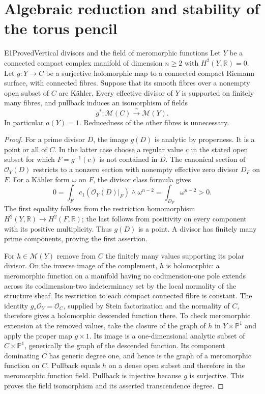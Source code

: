 \section{Algebraic reduction and stability of the torus pencil}
\label{sec:E}

\begin{statement}{E1}{Proved}{Vertical divisors and the field of meromorphic functions}
Let $Y$ be a connected compact complex manifold of dimension $n\geq2$
with $H^2(Y,\mathbb R)=0$. Let $g:Y\to C$ be a surjective holomorphic
map to a connected compact Riemann surface, with connected fibres.
Suppose that its smooth fibres over a nonempty open subset of $C$ are
K\"ahler. Every effective divisor of $Y$ is supported on finitely many
fibres, and pullback induces an isomorphism of fields
\[
 g^*: \mathcal M(C)\xrightarrow{\ \sim\ }\mathcal M(Y).
\]
In particular $a(Y)=1$. Reducedness of the other fibres is unnecessary.
\end{statement}
\begin{proof}
For a prime divisor $D$, the image $g(D)$ is analytic by properness. It
is a point or all of $C$. In the latter case choose a regular value $c$
in the stated open subset for which $F=g^{-1}(c)$ is not contained in
$D$. The canonical section of $\mathcal O_Y(D)$ restricts to a nonzero
section with nonempty effective zero divisor $D_F$ on $F$. For a
K\"ahler form $\omega$ on $F$, the divisor class formula gives
\[
 0=\int_F c_1(\mathcal O_Y(D)|_F)\wedge\omega^{n-2}
   =\int_{D_F}\omega^{n-2}>0.
\]
The first equality follows from the restriction homomorphism
$H^2(Y,\mathbb R)\to H^2(F,\mathbb R)$; the last follows from positivity
on every component with its positive multiplicity. Thus $g(D)$ is a
point. A divisor has finitely many prime components, proving the first
assertion.

For $h\in\mathcal M(Y)$ remove from $C$ the finitely many values
supporting its polar divisor. On the inverse image of the complement,
$h$ is holomorphic: a meromorphic function on a manifold having no
codimension-one pole extends across its codimension-two indeterminacy
set by the local normality of the structure sheaf. Its restriction to
each compact connected fibre is constant. The identity
$g_*\mathcal O_Y=\mathcal O_C$, supplied by Stein factorization and
the normality of $C$, therefore gives a holomorphic descended function
there. To check meromorphic extension at the removed values, take the
closure of the graph of $h$ in $Y\times\mathbb P^1$ and apply the proper
map $g\times1$. Its image is a one-dimensional analytic subset of
$C\times\mathbb P^1$, generically the graph of the descended function.
Its component dominating $C$ has generic degree one, and hence is the
graph of a meromorphic function on $C$. Pullback equals $h$ on a dense
open subset and therefore in the meromorphic function field. Pullback
is injective because $g$ is surjective. This proves the field
isomorphism and its asserted transcendence degree.
\end{proof}

